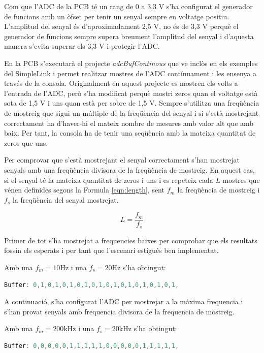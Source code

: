 Com que l'ADC de la PCB té un rang de 0 a 3,3 V s'ha configurat el generador de funcions amb un òfset per tenir un senyal sempre en voltatge positiu.
L'amplitud del senyal és d'aproximadament 2,5 V, no és de 3,3 V perquè el generador de funcions sempre supera breument l'amplitud del senyal i d'aquesta manera s'evita superar els 3,3 V i protegir l'ADC.

En la PCB s'executarà el projecte \textit{adcBufContinous} que ve inclòs en els exemples del SimpleLink i permet realitzar mostres de l'ADC contínuament i les ensenya a través de la consola.
Originalment en aquest projecte es mostren els volts a l'entrada de l'ADC, però s'ha modificat perquè mostri zeros quan el voltatge està sota de 1,5 V i uns quan està per sobre de 1,5 V.
Sempre s'utilitza una freqüència de mostreig que sigui un múltiple de la freqüència del senyal i si s'està mostrejant correctament ha d'haver-hi el mateix nombre de mesures amb valor alt que amb baix.
Per tant, la consola ha de tenir una seqüència amb la mateixa quantitat de zeros que uns.

Per comprovar que s'està mostrejant el senyal correctament s'han mostrejat senyals amb una freqüència divisora de la freqüència de mostreig.
En aquest cas, si el senyal té la mateixa quantitat de zeros i uns i es repeteix cada $L$ mostres que vénen definides segons la Formula \ref{eqn:length}, sent $f_{m}$ la freqüència de mostreig i $f_{s}$ la freqüència del senyal mostrejat.


\begin{equation}
	\label{eqn:length}
	L=\frac{f_{m}}{f_{s}}
\end{equation}

Primer de tot s'ha mostrejat a frequencies baixes per comprobar que els resultats fossin els esperats i per tant que l'escenari estigués ben implementat.

Amb una $f_{m}=10$Hz i una $f_{s}=20$Hz s'ha obtingut:
\begin{lstlisting}[language=C]
	Buffer: 0,1,0,1,0,1,0,1,0,1,0,1,0,1,0,1,0,1,0,1,
\end{lstlisting}

A continuació, s'ha configurat l'ADC per mostrejar a la màxima frequencia i s'han provat senyals amb frequencia divisora de la frequencia de mostreig.

Amb una $f_{m}=200$kHz i una $f_{s}=20$kHz s'ha obtingut:
\begin{lstlisting}[language=C]
	Buffer: 0,0,0,0,0,1,1,1,1,1,0,0,0,0,0,1,1,1,1,1,
\end{lstlisting}

